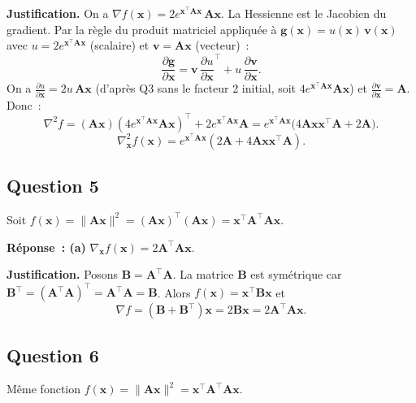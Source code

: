 \documentclass[12pt,letterpaper]{article}
\begin{document}
\textbf{Justification.}
On a $\nabla f(\mathbf{x}) = 2e^{\mathbf{x}^\top\mathbf{A}\mathbf{x}}\,\mathbf{A}\mathbf{x}$. La Hessienne est le Jacobien du gradient. Par la règle du produit matriciel appliquée à $\mathbf{g}(\mathbf{x}) = u(\mathbf{x})\,\mathbf{v}(\mathbf{x})$ avec $u = 2e^{\mathbf{x}^\top\mathbf{A}\mathbf{x}}$ (scalaire) et $\mathbf{v} = \mathbf{A}\mathbf{x}$ (vecteur)~:
\[
\frac{\partial \mathbf{g}}{\partial \mathbf{x}} = \mathbf{v}\,\frac{\partial u}{\partial \mathbf{x}}^\top + u\,\frac{\partial \mathbf{v}}{\partial \mathbf{x}}.
\]
On a $\frac{\partial u}{\partial \mathbf{x}} = 2u\,\mathbf{A}\mathbf{x}$ (d'après Q3 sans le facteur 2 initial, soit $4e^{\mathbf{x}^\top\mathbf{A}\mathbf{x}}\mathbf{A}\mathbf{x}$) et $\frac{\partial \mathbf{v}}{\partial \mathbf{x}} = \mathbf{A}$. Donc~:
\[
\nabla^2 f = (\mathbf{A}\mathbf{x})(4e^{\mathbf{x}^\top\mathbf{A}\mathbf{x}}\mathbf{A}\mathbf{x})^\top + 2e^{\mathbf{x}^\top\mathbf{A}\mathbf{x}}\mathbf{A} %
= e^{\mathbf{x}^\top\mathbf{A}\mathbf{x}}\bigl(4\mathbf{A}\mathbf{x}\mathbf{x}^\top\mathbf{A} + 2\mathbf{A}\bigr).
\]
\[
\boxed{\nabla^2_{\mathbf{x}} f(\mathbf{x}) = e^{\mathbf{x}^\top\mathbf{A}\mathbf{x}}(2\mathbf{A} + 4\mathbf{A}\mathbf{x}\mathbf{x}^\top\mathbf{A})}.
\]

\subsection{Question 5}

Soit $f(\mathbf{x}) = \|\mathbf{A}\mathbf{x}\|^2 = (\mathbf{A}\mathbf{x})^\top(\mathbf{A}\mathbf{x}) = \mathbf{x}^\top\mathbf{A}^\top\mathbf{A}\mathbf{x}$. %

\textbf{Réponse~: (a)} $\nabla_{\mathbf{x}} f(\mathbf{x}) = 2\mathbf{A}^\top\mathbf{A}\mathbf{x}$.

\textbf{Justification.}
Posons $\mathbf{B} = \mathbf{A}^\top\mathbf{A}$. La matrice $\mathbf{B}$ est symétrique car $\mathbf{B}^\top = (\mathbf{A}^\top\mathbf{A})^\top = \mathbf{A}^\top\mathbf{A} = \mathbf{B}$. %
Alors $f(\mathbf{x}) = \mathbf{x}^\top\mathbf{B}\mathbf{x}$ et
\[
\nabla f = (\mathbf{B}+\mathbf{B}^\top)\mathbf{x} = 2\mathbf{B}\mathbf{x} = \boxed{2\mathbf{A}^\top\mathbf{A}\mathbf{x}}.
\]

\subsection{Question 6}

Même fonction $f(\mathbf{x}) = \|\mathbf{A}\mathbf{x}\|^2 = \mathbf{x}^\top\mathbf{A}^\top\mathbf{A}\mathbf{x}$.
\end{document}
